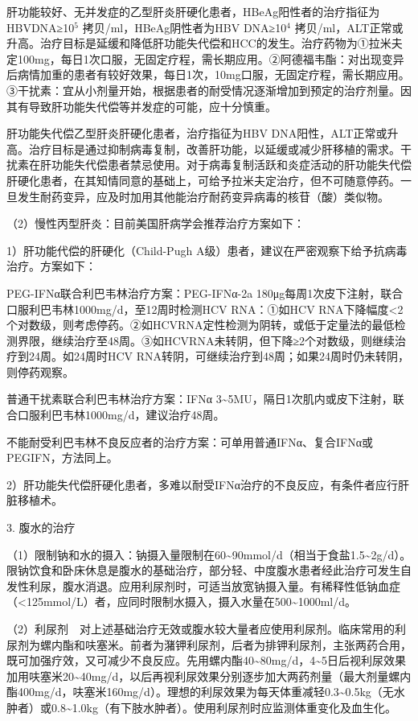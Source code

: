 肝功能较好、无并发症的乙型肝炎肝硬化患者，HBeAg阳性者的治疗指征为HBVDNA≥10$^{5}$
拷贝/ml，HBeAg阴性者为HBV DNA≥10$^{4}$
拷贝/ml，ALT正常或升高。治疗目标是延缓和降低肝功能失代偿和HCC的发生。治疗药物为①拉米夫定100mg，每日1次口服，无固定疗程，需长期应用。②阿德福韦酯：对出现变异后病情加重的患者有较好效果，每日1次，10mg口服，无固定疗程，需长期应用。③干扰素：宜从小剂量开始，根据患者的耐受情况逐渐增加到预定的治疗剂量。因其有导致肝功能失代偿等并发症的可能，应十分慎重。

肝功能失代偿乙型肝炎肝硬化患者，治疗指征为HBV
DNA阳性，ALT正常或升高。治疗目标是通过抑制病毒复制，改善肝功能，以延缓或减少肝移植的需求。干扰素在肝功能失代偿患者禁忌使用。对于病毒复制活跃和炎症活动的肝功能失代偿肝硬化患者，在其知情同意的基础上，可给予拉米夫定治疗，但不可随意停药。一旦发生耐药变异，应及时加用其他能治疗耐药变异病毒的核苷（酸）类似物。

（2）慢性丙型肝炎：目前美国肝病学会推荐治疗方案如下：

1）肝功能代偿的肝硬化（Child-Pugh
A级）患者，建议在严密观察下给予抗病毒治疗。方案如下：

PEG-IFNα联合利巴韦林治疗方案：PEG-IFNα-2a
180μg每周1次皮下注射，联合口服利巴韦林1000mg/d，至12周时检测HCV
RNA：①如HCV
RNA下降幅度\textless{}2个对数级，则考虑停药。②如HCVRNA定性检测为阴转，或低于定量法的最低检测界限，继续治疗至48周。③如HCVRNA未转阴，但下降≥2个对数级，则继续治疗到24周。如24周时HCV
RNA转阴，可继续治疗到48周；如果24周时仍未转阴，则停药观察。

普通干扰素联合利巴韦林治疗方案：IFNα
3\textasciitilde{}5MU，隔日1次肌内或皮下注射，联合口服利巴韦林1000mg/d，建议治疗48周。

不能耐受利巴韦林不良反应者的治疗方案：可单用普通IFNα、复合IFNα或PEGIFN，方法同上。

2）肝功能失代偿肝硬化患者，多难以耐受IFNα治疗的不良反应，有条件者应行肝脏移植术。

3. 腹水的治疗

（1）限制钠和水的摄入：钠摄入量限制在60\textasciitilde{}90mmol/d（相当于食盐1.5\textasciitilde{}2g/d）。限钠饮食和卧床休息是腹水的基础治疗，部分轻、中度腹水患者经此治疗可发生自发性利尿，腹水消退。应用利尿剂时，可适当放宽钠摄入量。有稀释性低钠血症（\textless{}125mmol/L）者，应同时限制水摄入，摄入水量在500\textasciitilde{}1000ml/d。

（2）利尿剂　对上述基础治疗无效或腹水较大量者应使用利尿剂。临床常用的利尿剂为螺内酯和呋塞米。前者为潴钾利尿剂，后者为排钾利尿剂，主张两药合用，既可加强疗效，又可减少不良反应。先用螺内酯40\textasciitilde{}80mg/d，4\textasciitilde{}5日后视利尿效果加用呋塞米20\textasciitilde{}40mg/d，以后再视利尿效果分别逐步加大两药剂量（最大剂量螺内酯400mg/d，呋塞米160mg/d）。理想的利尿效果为每天体重减轻0.3\textasciitilde{}0.5kg（无水肿者）或0.8\textasciitilde{}1.0kg（有下肢水肿者）。使用利尿剂时应监测体重变化及血生化。

